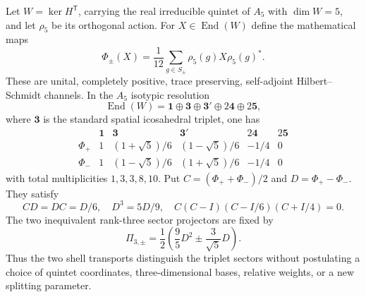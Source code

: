 \documentclass[11pt]{article}
\begin{document}
\begin{theorem}
\label{p1b:thm:two-shell-adjoint-triplet}
Let $W=\ker H^{\mathsf T}$, carrying the real irreducible quintet of
$A_5$ with $\dim W=5$, and let $\rho_5$ be its orthogonal action.
For $X\in\operatorname{End}(W)$ define the mathematical maps
\[
 \Phi_\pm(X)=\frac1{12}\sum_{g\in S_\pm}
          \rho_5(g)X\rho_5(g)^{*}.
\]
These are unital, completely positive, trace preserving, self-adjoint
Hilbert--Schmidt channels.  In the $A_5$ isotypic resolution
\[
 \operatorname{End}(W)=\mathbf1\oplus\mathbf3\oplus\mathbf3'
                     \oplus2\mathbf4\oplus2\mathbf5,
\]
where $\mathbf3$ is the standard spatial icosahedral triplet, one has
\[
 \begin{array}{c|ccccc}
 &\mathbf1&\mathbf3&\mathbf3'&2\mathbf4&2\mathbf5\\ \hline
 \Phi_+&1&(1+\sqrt5)/6&(1-\sqrt5)/6&-1/4&0\\
 \Phi_-&1&(1-\sqrt5)/6&(1+\sqrt5)/6&-1/4&0
 \end{array}
\]
with total multiplicities $1,3,3,8,10$.  Put
$C=(\Phi_++\Phi_-)/2$ and $D=\Phi_+-\Phi_-$.  They satisfy
\[
 \boxed{CD=DC=D/6,\quad D^3=5D/9,\quad
 C(C-I)(C-I/6)(C+I/4)=0.}
\]
The two inequivalent rank-three sector projectors are fixed by
\[
 \boxed{\Pi_{3,\pm}=\frac12\left(\frac95D^2
                                   \pm\frac3{\sqrt5}D\right).}
\]
Thus the two shell transports distinguish the triplet sectors without
postulating a choice of quintet coordinates, three-dimensional bases,
relative weights, or a new splitting parameter.
\end{theorem}
\end{document}
